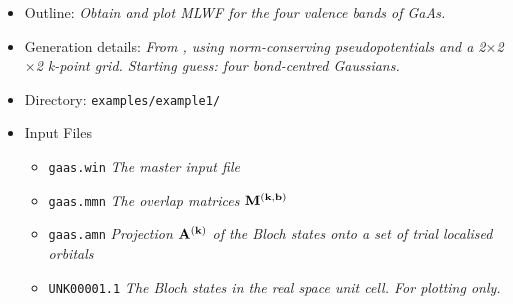 \documentclass[a4paper,11pt,twoside]{article}
\begin{document}
\begin{itemize}
\item{Outline: \it{Obtain and plot MLWF for the four valence
    bands of GaAs.}} 
\item{Generation details: \it{From \pwscf, using norm-conserving
    pseudopotentials and a 2$\times$2$\times$2 k-point grid. Starting
    guess: four bond-centred Gaussians.}}
\item{Directory: {\tt examples/example1/}}
\item{Input Files}
\begin{itemize}
\item{ {\tt gaas.win}  {\it The master input file}}
\item{ {\tt gaas.mmn}  {\it The overlap matrices $\mathbf{M}^{(\mathbf{k},\mathbf{b})}$}}
\item{ {\tt gaas.amn}  {\it Projection $\mathbf{A}^{(\mathbf{k})}$ of the Bloch states onto a set
    of trial localised orbitals}} 
\item{ {\tt UNK00001.1}  {\it The Bloch states in the real space unit
    cell. For plotting only.}} 
\end{itemize}
\end{itemize}
\end{document}
